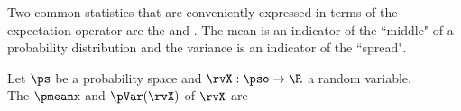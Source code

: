 Two common statistics that are conveniently expressed in terms of the
expectation operator are the  and .
The mean is an indicator of the ``middle" of a probability distribution and the
variance is an indicator of the ``spread".
\begin{definition}
\label{def:Mx}
\label{def:pVar}
Let $\ps$ be a probability space and $\rvX:\pso\to\R$ a random variable.\\
The  $\pmeanx$ and  $\pVar(\rvX)$ of $\rvX$ are
\end{definition}

